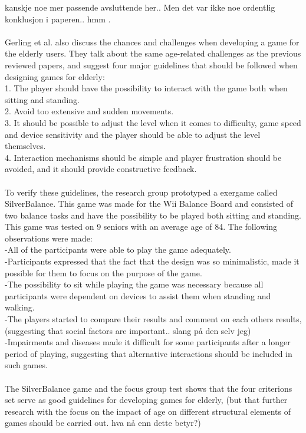 kanskje noe mer passende avsluttende her.. Men det var ikke noe ordentlig konklusjon i paperen.. hmm \cite{gregor}. \\ \\
Gerling et al. \cite{gerling1} also discuss the chances and challenges when developing a game for the elderly users. They talk about the same age-related challenges as the previous reviewed papers, and suggest four major guidelines that should be followed when designing games for elderly: \\
1. The player should have the possibility to interact with the game both when sitting and standing. \\
2. Avoid too extensive and sudden movements.\\
3. It should be possible to adjust the level when it comes to difficulty, game speed and device sensitivity and the player should be able to adjust the level themselves. \\
4. Interaction mechanisms should be simple and player frustration should be avoided, and it should provide constructive feedback.\\ \\
To verify these guidelines, the research group prototyped a exergame called SilverBalance. This game was made for the Wii Balance Board and consisted of two balance tasks and have the possibility to be played both sitting and standing. This game was tested on 9 seniors with an average age of 84. The following observations were made: \\
-All of the participants were able to play the game adequately. \\
-Participants expressed that the fact that the design was so minimalistic, made it possible for them to focus on the purpose of the game. \\
-The possibility to sit while playing the game was necessary because all participants were dependent on devices to assist them when standing and walking.\\
-The players started to compare their results and comment on each others results, (suggesting that social factors are important.. slang på den selv jeg)\\
-Impairments and diseases made it difficult for some participants after a longer period of playing, suggesting that alternative interactions should be included in such games.\\ \\
The SilverBalance game and the focus group test shows that the four criterions set serve as good guidelines for developing games for elderly, (but that further research with the focus on the impact of age on different structural elements of games should be carried out. hva nå enn dette betyr?) \cite{gerling1}\\ \\
